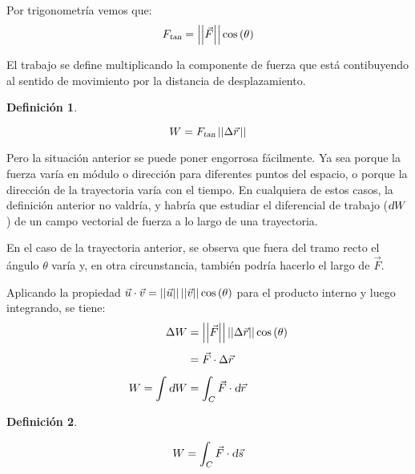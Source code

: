 \documentclass[a5paper,12pt,twoside]{book}
\newtheorem{defn}{{Definición}}[chapter]
\begin{document}
Por trigonometría vemos que:
\begin{equation*}
    {{F}_\textsl{{tan}}} = {\left|\left| {\vec{F}} \right|\right|} \cos\left(\theta\right)
\end{equation*}

El trabajo se define multiplicando la componente de fuerza que está contibuyendo al sentido de movimiento por la distancia de desplazamiento.

\begin{mdframed}[style=MyFrame1]
    \begin{defn}
    \end{defn}
    \begin{equation*}
        W = {{F}_\textsl{{tan}}} \, {\left|\left| {\Delta \vec{r}\hspace{0.05cm}} \right|\right|}
    \end{equation*}
\end{mdframed}

Pero la situación anterior se puede poner engorrosa fácilmente.
Ya sea porque la fuerza varía en módulo o dirección para diferentes puntos del espacio, o porque la dirección de la trayectoria varía con el tiempo.
En cualquiera de estos casos, la definición anterior no valdría, y habría que estudiar el diferencial de trabajo ($\textsl{d} W$) de un campo vectorial de fuerza a lo largo de una trayectoria.

En el caso de la trayectoria anterior, se observa que fuera del tramo recto el ángulo $\theta$ varía y, en otra circunstancia, también podría hacerlo el largo de $\vec{F}$.

\begin{center}
    \def\svgwidth{0.8\linewidth}
    
\end{center}

Aplicando la propiedad $\vec{u} \cdot \vec{v} = {\left|\left| {\vec{u}} \right|\right|} \, {\left|\left| {\vec{v}} \right|\right|} \cos\left(\theta\right)$ para el producto interno y luego integrando, se tiene:
\begin{align*}
    \Delta W &= {\left|\left| {\vec{F}} \right|\right|} \, {\left|\left| {\Delta \vec{r}} \right|\right|} \cos\left(\theta\right)
    \\[1ex]
    &= \vec{F} \cdot \Delta \vec{r}\hspace{0.05cm}
    \\[1ex]
    W = \int \textsl{d} W &= \int_C \vec{F} \cdot \textsl{d} \vec{r}\hspace{0.05cm}
\end{align*}

\begin{mdframed}[style=MyFrame1]
    \begin{defn}
        \label{defn:workLineIntegral}
    \end{defn}
    \begin{equation*}
        W = \int_C \Vec{F} \cdot \textsl{d} \Vec{s}
    \end{equation*}
\end{mdframed}
\end{document}
